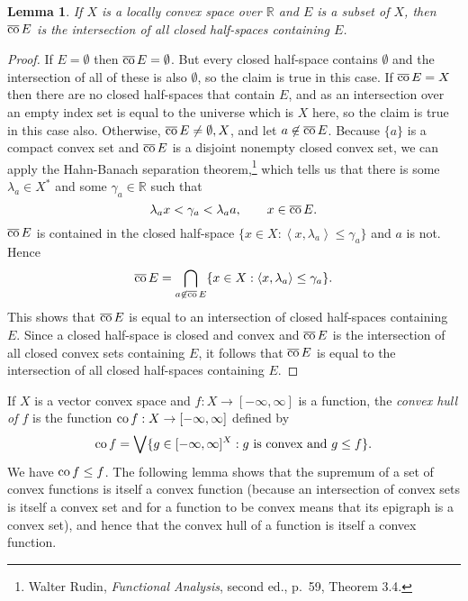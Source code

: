 \documentclass{article}
\newcommand{\inner}[2]{\left\langle #1, #2 \right\rangle}
\newcommand{\co}{\ensuremath\mathrm{co}\,}
\newcommand{\cco}{\ensuremath\overline{\mathrm{co}}\,}
\newtheorem{lemma}[theorem]{Lemma}
\theoremstyle{definition}
\begin{document}
\begin{lemma}
If $X$ is a locally convex space over $\mathbb{R}$ and $E$ is a subset of $X$, then $\cco E$ is the intersection of all closed half-spaces containing $E$.
\end{lemma}
\begin{proof}
If $E = \emptyset$ then $\cco E = \emptyset$. But every closed half-space contains $\emptyset$ and the intersection of all of these is also $\emptyset$, so the claim is true in this
case.
If $\cco E=X$ then there are no closed half-spaces that contain $E$, and as an intersection over an empty index set is
equal to the universe which is $X$ here, so the claim is true in this case also. Otherwise,
$\cco E \neq \emptyset, X$, and
let $a \not \in \cco E$.  Because $\{a\}$
is a compact convex set and $\cco E$ is a  disjoint nonempty closed convex set, we can apply the Hahn-Banach separation theorem,\footnote{Walter
Rudin, {\em Functional Analysis}, second ed., p.~59, Theorem 3.4.} which tells us that there is some $\lambda_a \in X^*$ and some $\gamma_a \in \mathbb{R}$ such that
\[
 \lambda_a x < \gamma_a < \lambda_a a, \qquad x \in \cco E. 
\]
 $\cco E$ is contained in the closed half-space $\{x \in X: \inner{x}{\lambda_a} \leq \gamma_a\}$ and $a$ is not. Hence
\[
\cco E = \bigcap_{a \not \in \cco E} \{x \in X: \inner{x}{\lambda_a} \leq \gamma_a\}.
\]
This shows that $\cco E$ is equal to an intersection of closed half-spaces containing $E$. Since a closed half-space is closed and convex and
$\cco E$ is the intersection of all closed convex sets containing $E$, it follows that $\cco E$ is equal to the intersection of all closed half-spaces containing $E$.
\end{proof}

If $X$ is a vector convex space and $f:X \to [-\infty,\infty]$ is a function, the {\em convex hull of $f$} is the
function $\co f:X \to [-\infty,\infty]$ defined by
\[
\co f = \bigvee \{g \in [-\infty,\infty]^X: \textrm{$g$ is convex and $g \leq f$}\}.
\]
We have $\co f \leq f$. The following lemma shows
that the supremum of a set of convex functions is itself a convex function (because an intersection of convex sets is itself a convex set and for a function to be convex
means that its epigraph is a convex set), and hence
that the convex hull of a function is itself a convex function.
\end{document}
